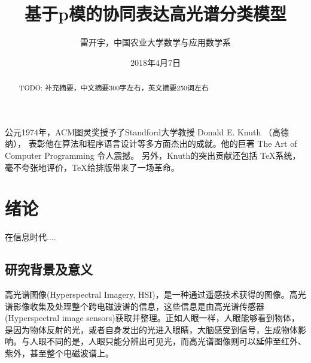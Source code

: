\documentclass[12pt,a4paper]{article}
\begin{document}
\newtheorem{example}{例}             %
\newtheorem{algorithm}{算法}
\newtheorem{theorem}{定理}[section]  %
\newtheorem{definition}{定义}
\newtheorem{axiom}{公理}
\newtheorem{property}{性质}
\newtheorem{proposition}{命题}
\newtheorem{lemma}{引理}
\newtheorem{corollary}{推论}
\newtheorem{remark}{注解}
\newtheorem{condition}{条件}
\newtheorem{conclusion}{结论}
\newtheorem{assumption}{假设}

\renewcommand{\contentsname}{目录}     %
\renewcommand{\abstractname}{摘要}     %
\renewcommand{\refname}{参考文献}      %
\renewcommand{\indexname}{索引}
\renewcommand{\figurename}{图}
\renewcommand{\tablename}{表}
\renewcommand{\appendixname}{附录}
\renewcommand{\proofname}{证明}
\renewcommand{\algorithm}{算法}

\title{基于p模的协同表达高光谱分类模型}
\author{雷开宇，中国农业大学数学与应用数学系}
\date{2018年4月7日}
\maketitle                            %
\tableofcontents                      %
\thispagestyle{empty}                 %

\begin{abstract}
\noindent TODO: 补充摘要，中文摘要300字左右，英文摘要250词左右
\end{abstract}

公元1974年，ACM图灵奖授予了Standford大学教授 Donald E. Knuth （高德纳），
表彰他在算法和程序语言设计等多方面杰出的成就。他的巨著 The Art of Computer Programming 令人震撼。
另外，Knuth的突出贡献还包括 \TeX 系统，毫不夸张地评价，\TeX 给排版带来了一场革命。




\section{绪论}
\indent   %

在信息时代....

\subsection{研究背景及意义}
高光谱图像(Hyperspectral Imagery, HSI)，是一种通过遥感技术获得的图像。高光谱影像收集及处理整个跨电磁波谱的信息，这些信息是由高光谱传感器(Hyperspectral image sensors)获取并整理。正如人眼一样，人眼能够看到物体，是因为物体反射的光，或者自身发出的光进入眼睛，大脑感受到信号，生成物体影响。与人眼不同的是，人眼只能分辨出可见光，而高光谱图像则可以延伸至红外、紫外，甚至整个电磁波谱上。\\
\end{document}
